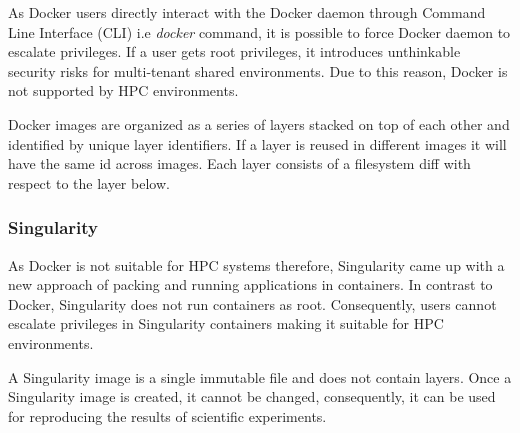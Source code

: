 \documentclass[a4paper,num-refs]{oup-contemporary}
\begin{document}

As Docker users directly interact with the
Docker daemon through Command Line Interface (CLI) i.e \textit{docker} command, it is possible to force Docker daemon to escalate privileges.
If a user gets root privileges, it
introduces unthinkable security risks for multi-tenant shared
environments. Due to this reason, Docker is not supported by
HPC environments.

Docker images are organized as a series of layers stacked on top of each
other and identified by unique layer identifiers. If a layer is reused
in different images it will
have the same id across images. Each layer consists of a filesystem diff
with respect to the layer below.

\subsubsection{Singularity}

As Docker is not suitable for HPC systems therefore, Singularity came up with a new approach
of packing and running applications in containers. 
In contrast to Docker,
Singularity does not run containers as root. Consequently, users cannot escalate
privileges in Singularity containers making it suitable for HPC environments.

A Singularity image is a single immutable file and
does not contain layers.
Once a Singularity image is created, it cannot be changed, consequently,
it can be used for reproducing the results of scientific
experiments.
\end{document}
